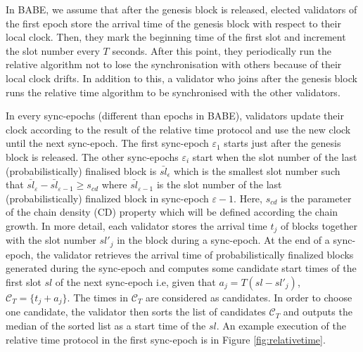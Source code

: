 \documentclass{article}
\newcommand{\slot}{\ensuremath{sl}} %
\begin{document}
In BABE, we assume that after the genesis block is released, elected validators of the first epoch store the arrival time of the genesis block with respect to their local clock. Then, they mark the beginning
time of the first slot and increment
the slot number every $ T $ seconds. After this point,  they periodically run the relative algorithm not to lose the synchronisation with others because of their local clock drifts.  In addition to this, a validator who
joins after the genesis block runs the relative time algorithm to be synchronised with the other validators.

In every sync-epochs (different than epochs in BABE), validators update their clock according to the result of the relative time protocol and use the new clock until the next sync-epoch. The first sync-epoch $\varepsilon_1$ starts just after the genesis block is released. The other sync-epochs  $\varepsilon_i$ start when the slot number of the last (probabilistically) finalised block is $\bar{sl}_{\epsilon}$ which is the smallest slot number such that  $\bar{sl}_{\varepsilon} - \bar{sl}_{\varepsilon-1} \geq s_{cd}$ where $\bar{sl}_{\varepsilon-1}$ is the slot number of the last (probabilistically) finalized block in sync-epoch $\varepsilon-1$. Here, $s_{cd}$ is the parameter of the chain density (CD) property which will be defined according the chain growth.
In more detail, each validator  stores  the arrival time $ t_j $ of  blocks together with the slot number $\slot'_j$ in the block during a sync-epoch. At the end of a sync-epoch, the validator retrieves the arrival time of probabilistically finalized blocks generated during the sync-epoch and computes some candidate start times of the first slot $ \slot $ of the next sync-epoch i.e,  given that $ a_j = T(\slot - \slot'_j)  $,  $\mathcal{C}_T = \{t_j+a_j \}$. The times in $ \mathcal{C}_T $ are considered as candidates. In order to  choose one candidate,  the validator then sorts the list of candidates $ \mathcal{C}_T $ and outputs the median of the sorted list as a start time of the $ \slot $. An example execution of the relative time protocol in the first sync-epoch is in Figure \ref{fig:relativetime}.
\end{document}
